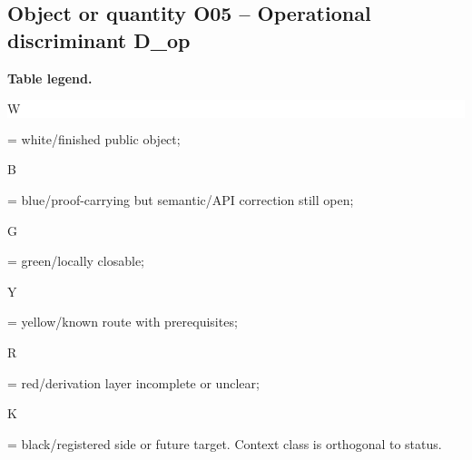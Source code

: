 \subsection*{Object or quantity O05 -- Operational discriminant D\_op}
\hypertarget{objproof:O05}{}
\par\smallskip\noindent\begin{minipage}{0.99\linewidth}\footnotesize\raggedright\textbf{Table legend.} \colorbox{white}{\strut W} = white/finished public object; \colorbox{cyan!20}{\strut B} = blue/proof-carrying but semantic/API correction still open; \colorbox{green!18}{\strut G} = green/locally closable; \colorbox{yellow!25}{\strut Y} = yellow/known route with prerequisites; \colorbox{red!20}{\strut R} = red/derivation layer incomplete or unclear; \colorbox{black!18}{\strut K} = black/registered side or future target. Context class is orthogonal to status.\end{minipage}\par\vspace{0.25em}
